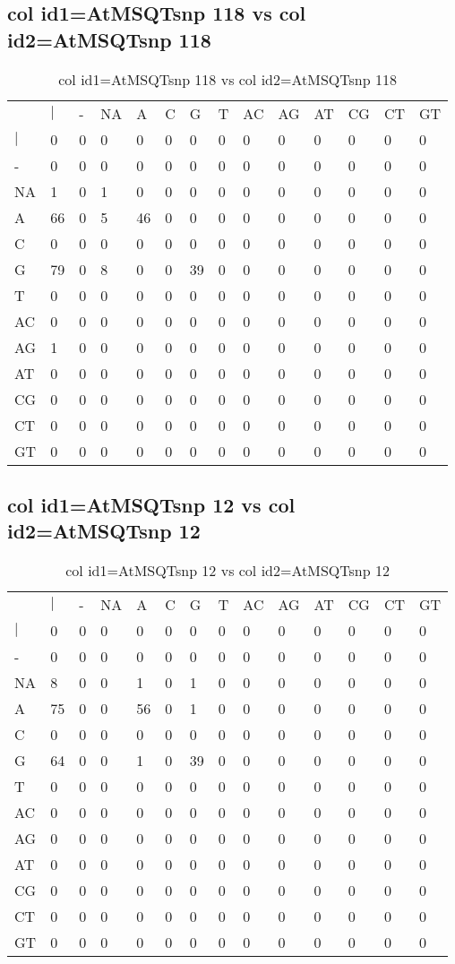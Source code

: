 \subsection{col id1=AtMSQTsnp 118 vs col id2=AtMSQTsnp 118}
\begin{center}
\begin{longtable}{|l|l|l|l|l|l|l|l|l|l|l|l|l|l|}
\caption{col id1=AtMSQTsnp 118 vs col id2=AtMSQTsnp 118} \label{table_dm508}\\
\hline
\\
\hline
&$|$&-&NA&A&C&G&T&AC&AG&AT&CG&CT&GT\\
$|$&0&0&0&0&0&0&0&0&0&0&0&0&0\\
-&0&0&0&0&0&0&0&0&0&0&0&0&0\\
NA&1&0&1&0&0&0&0&0&0&0&0&0&0\\
A&66&0&5&46&0&0&0&0&0&0&0&0&0\\
C&0&0&0&0&0&0&0&0&0&0&0&0&0\\
G&79&0&8&0&0&39&0&0&0&0&0&0&0\\
T&0&0&0&0&0&0&0&0&0&0&0&0&0\\
AC&0&0&0&0&0&0&0&0&0&0&0&0&0\\
AG&1&0&0&0&0&0&0&0&0&0&0&0&0\\
AT&0&0&0&0&0&0&0&0&0&0&0&0&0\\
CG&0&0&0&0&0&0&0&0&0&0&0&0&0\\
CT&0&0&0&0&0&0&0&0&0&0&0&0&0\\
GT&0&0&0&0&0&0&0&0&0&0&0&0&0\\
\hline
\end{longtable}
\end{center}

\subsection{col id1=AtMSQTsnp 12 vs col id2=AtMSQTsnp 12}
\begin{center}
\begin{longtable}{|l|l|l|l|l|l|l|l|l|l|l|l|l|l|}
\caption{col id1=AtMSQTsnp 12 vs col id2=AtMSQTsnp 12} \label{table_dm510}\\
\hline
\\
\hline
&$|$&-&NA&A&C&G&T&AC&AG&AT&CG&CT&GT\\
$|$&0&0&0&0&0&0&0&0&0&0&0&0&0\\
-&0&0&0&0&0&0&0&0&0&0&0&0&0\\
NA&8&0&0&1&0&1&0&0&0&0&0&0&0\\
A&75&0&0&56&0&1&0&0&0&0&0&0&0\\
C&0&0&0&0&0&0&0&0&0&0&0&0&0\\
G&64&0&0&1&0&39&0&0&0&0&0&0&0\\
T&0&0&0&0&0&0&0&0&0&0&0&0&0\\
AC&0&0&0&0&0&0&0&0&0&0&0&0&0\\
AG&0&0&0&0&0&0&0&0&0&0&0&0&0\\
AT&0&0&0&0&0&0&0&0&0&0&0&0&0\\
CG&0&0&0&0&0&0&0&0&0&0&0&0&0\\
CT&0&0&0&0&0&0&0&0&0&0&0&0&0\\
GT&0&0&0&0&0&0&0&0&0&0&0&0&0\\
\hline
\end{longtable}
\end{center}

